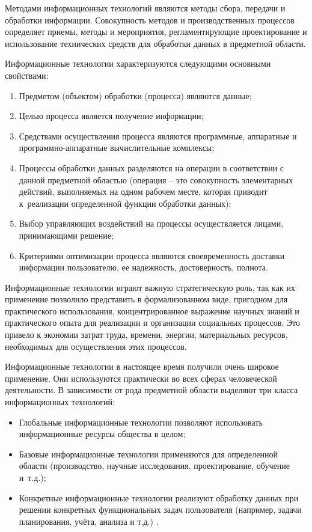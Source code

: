 \documentclass{ou}
\begin{document}
Методами информационных технологий являются методы сбора, передачи и обработки информации. Совокупность методов и производственных процессов определяет приемы, методы и мероприятия, регламентирующие проектирование и использование технических средств для обработки данных в предметной области.

Информационные технологии характеризуются следующими основными свойствами:
\begin{enumerate}[leftmargin=0em, itemindent=3.75em, nosep, label=\arabic*)]
\item Предметом (объектом) обработки (процесса) являются данные;
\item Целью процесса является получение информации;
\item Средствами осуществления процесса являются программные, аппаратные и программно-аппаратные вычислительные комплексы;
\item Процессы обработки данных разделяются на операции в соответствии с данной предметной областью (операция -- это совокупность элементарных действий, выполняемых на одном рабочем месте, которая приводит к~реализации определенной функции обработки данных);
\item Выбор управляющих воздействий на процессы осуществляется лицами, принимающими решение;
\item Критериями оптимизации процесса являются своевременность доставки информации пользователю, ее надежность, достоверность, полнота\cite{Cspo}.
\end{enumerate}

Информационные технологии играют важную стратегическую роль, так как их применение позволило представить в формализованном виде, пригодном для практического использования, концентрированное выражение научных знаний и практического опыта для реализации и организации социальных процессов. Это привело к экономии затрат труда, времени, энергии, материальных ресурсов, необходимых для осуществления этих процессов.

Информационные технологии в настоящее время получили очень широкое применение. Они используются практически во всех сферах человеческой деятельности. В зависимости от рода предметной области выделяют три класса информационных технологий:
\begin{itemize}[label=-, leftmargin=0em, itemindent=3.35em, nosep]
\item Глобальные информационные технологии позволяют использовать информационные ресурсы общества в целом;
\item Базовые информационные технологии применяются для определенной области (производство, научные исследования, проектирование, обучение и~т.д.);
\item Конкретные информационные технологии реализуют обработку данных при решении конкретных функциональных задач пользователя (например, задачи планирования, учёта, анализа и т.д.) \cite{Portal.tpu}.
\end{itemize}
\end{document}
